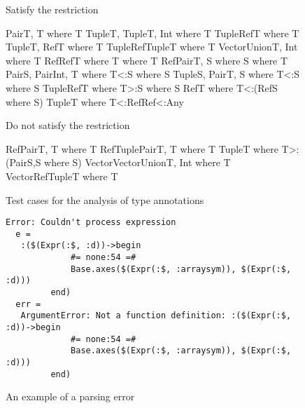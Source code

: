 \begin{figure}
\small
\begin{minipage}{6.5cm}
    \centering
    Satisfy the restriction
\begin{julia}
Pair{T, T} where T
Tuple{T, Tuple{T, Int}} where T
Tuple{Ref{T}} where T
Tuple{T, Ref{T}} where T
Tuple{Ref{Tuple{T}}} where T
Vector{Union{T, Int}} where T
Ref{Ref{T} where T} where T
Ref{Pair{T, S} where S} where T
Pair{S, Pair{Int, T} where T<:S} where S
Tuple{S, Pair{T, S} where T<:S} where S
Tuple{Ref{T} where T>:S} where S
Ref{T} where T<:(Ref{S} where S)
Tuple{T} where T<:Ref{Ref{<:Any}}
\end{julia}
\end{minipage}
\hspace{1cm}
\begin{minipage}{6cm}
    \centering
    Do not satisfy the restriction
\begin{julia}
Ref{Pair{T, T} where T}
Ref{Tuple{Pair{T, T} where T}}
Tuple{T} where T>:(Pair{S,S} where S)
Vector{Vector{Union{T, Int}} where T}
Vector{Ref{Tuple{T}} where T}
\end{julia}
\end{minipage}
\caption{Test cases for the analysis of type annotations
}\label{fig:tests:ta-analysis}
\end{figure}

\begin{figure}
\begin{lstlisting}
Error: Couldn't process expression
  e =
   :($(Expr(:$, :d))->begin
             #= none:54 =#
             Base.axes($(Expr(:$, :arraysym)), $(Expr(:$, :d)))
         end)
  err =
   ArgumentError: Not a function definition: :($(Expr(:$, :d))->begin
             #= none:54 =#
             Base.axes($(Expr(:$, :arraysym)), $(Expr(:$, :d)))
         end)
\end{lstlisting}
\caption{An example of a parsing error}\label{fig:evaluation-parse-errors}
\end{figure}

